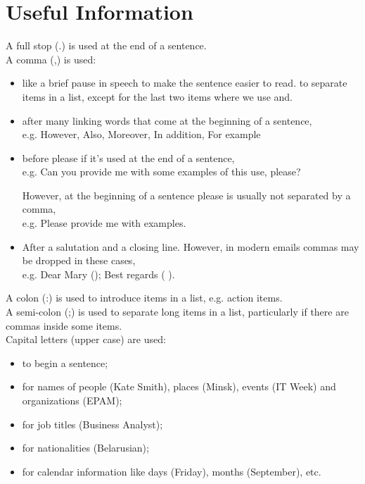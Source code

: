 \section{Useful Information}

A full stop (.) is used at the end of a sentence.\\

A comma (,) is used:
\begin{itemize}
\item like a brief pause in speech to make the sentence easier to read.
to separate items in a list, except for the last two items where we use and.
\item after many linking words that come at the beginning of a sentence,\\
e.g. However, Also, Moreover, In addition, For example

\item before please if it’s used at the end of a sentence,\\
e.g. Can you provide me with some examples of this use, please?

However, at the beginning of a sentence please is usually not separated by a comma,\\
e.g. Please provide me with examples.

\item After a salutation and a closing line. However, in modern emails commas may be dropped in these cases,\\
e.g. Dear Mary (); Best regards ( ).
\end{itemize}

A colon (:) is used to introduce items in a list, e.g. action items.\\

A semi-colon (;) is used to separate long items in a list, particularly if there are commas inside some items.\\

Capital letters (upper case) are used:
\begin{itemize}
\item to begin a sentence;
\item for names of people (Kate Smith), places (Minsk), events (IT Week) and organizations (EPAM);
\item for job titles (Business Analyst); 
\item for nationalities (Belarusian);
\item for calendar information like days (Friday), months (September), etc.
\end{itemize}